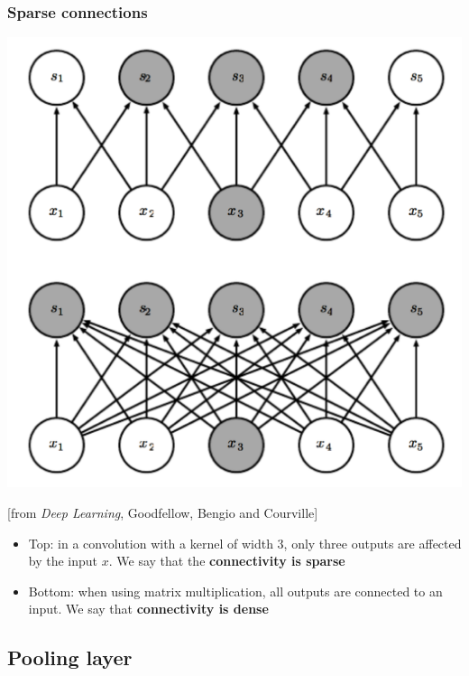 \begin{frame}
	\frametitle{Sparse connections}
	\begin{center}
		\includegraphics[width=0.5\textheight]{figs/weights-sharing1}

		{\small [from \emph{Deep Learning}, Goodfellow, Bengio and Courville]}
	\end{center}
	\begin{itemize}
		\medskip

		\item Top: in a convolution with a kernel of width 3, only three outputs are affected by the input $x$. We say that the \textbf{connectivity is sparse}

		\medskip

		\item Bottom: when using matrix multiplication, all outputs are connected to an input. We say that \textbf{connectivity is dense}
	\end{itemize}
\end{frame}



\subsection{Pooling layer}

